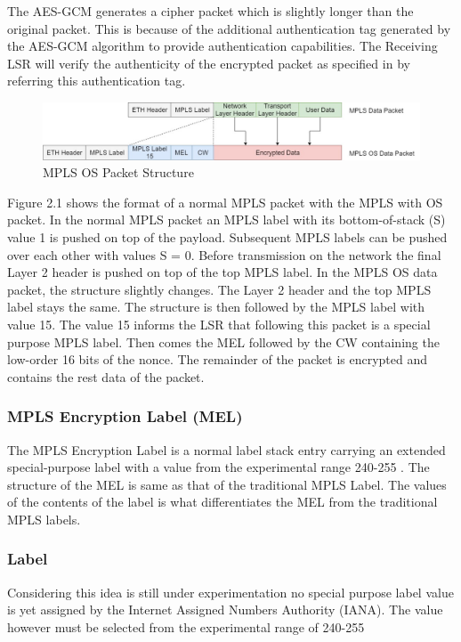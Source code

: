 The AES-GCM generates a cipher packet which is slightly longer than the original packet. This is because of the additional authentication tag generated by the AES-GCM algorithm to provide authentication capabilities. The Receiving LSR will verify the authenticity of the encrypted packet as specified in \cite{rfc7296} by referring this authentication tag.

\begin{figure}[H]
       \centering\includegraphics[width=\textwidth]{images/5_MPLS_Encrypted_Packet_Structure.jpg}
       \caption{MPLS OS Packet Structure}
       \label{fig:compbest}  
\end{figure}

Figure 2.1 shows the format of a normal MPLS packet with the MPLS with OS packet. In the normal MPLS packet an MPLS label with its bottom-of-stack (S) value 1 is pushed on top of the payload. Subsequent MPLS labels can be pushed over each other with values S = 0. Before transmission on the network the final Layer 2 header is pushed on top of the top MPLS label. In the MPLS OS data packet, the structure slightly changes. The Layer 2 header and the top MPLS label stays the same. The structure is then followed by the MPLS label with value 15. The value 15 informs the LSR that following this packet is a special purpose MPLS label. Then comes the MEL followed by the CW containing the low-order 16 bits of the nonce. The remainder of the packet is encrypted and contains the rest data of the packet.

\subsubsection{MPLS Encryption Label (MEL)}
The MPLS Encryption Label is a normal label stack entry carrying an extended special-purpose label with a value from the experimental range 240-255 \cite{mpls-os-internet-draft}. The structure of the MEL is same as that of the traditional MPLS Label. The values of the contents of the label is what differentiates the MEL from the traditional MPLS labels.

\subsubsection*{Label}
Considering this idea is still under experimentation no special purpose label value is yet assigned by the Internet Assigned Numbers Authority (IANA). The value however must be selected from the experimental range of 240-255

